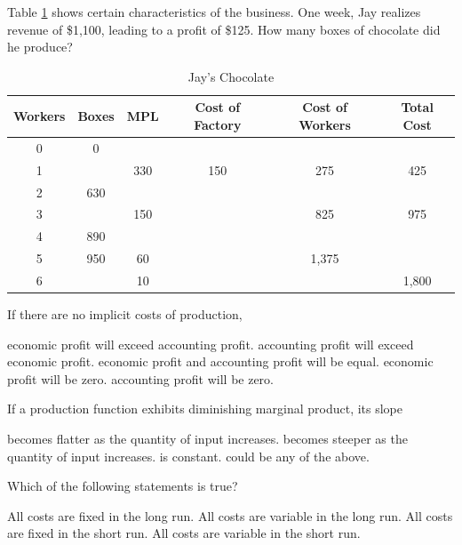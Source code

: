 \documentclass[addpoints,11pt]{exam}
\theoremstyle{definition}
\begin{document}
\begin{questions}
Table \ref{jay} shows certain characteristics of the business. One week, Jay realizes revenue of \$1,100, leading to a profit of \$125. How many boxes of chocolate did he produce?

\begin{table}[H]
	\caption{Jay's Chocolate}
	\centering
	\begin{tabular}{ c|c|c|c|c|c}        
		
		Workers  & Boxes & MPL & Cost of Factory & Cost of Workers & Total Cost \\
		\hline
		0 & 0 & & & & \\
		1 & & 330 & 150 & 275 & 425 \\
		2 & 630 & &&& \\
		3 &  & 150 & & 825 & 975  \\
		4 & 890 & &&& \\
		5 & 950 & 60 & & 1,375 & \\
		6 &  & 10 &&& 1,800 \\
	\end{tabular}
	\label{jay}
\end{table}

\begin{choices}
\end{choices}

\newpage

\question If there are no implicit costs of production,

\begin{choices}
	\choice economic profit will exceed accounting profit.
	\choice accounting profit will exceed economic profit.
	\CorrectChoice economic profit and accounting profit will be equal.
	\choice economic profit will be zero.
	\choice accounting profit will be zero.
\end{choices}

\question If a production function exhibits diminishing marginal product, its slope 

\begin{choices}
	\CorrectChoice becomes flatter as the quantity of input increases.
	\choice becomes steeper as the quantity of input increases.
	\choice is constant.
	\choice could be any of the above.
\end{choices}

\question Which of the following statements is true?

\begin{choices}
	\choice All costs are fixed in the long run.
	\CorrectChoice All costs are variable in the long run.
	\choice All costs are fixed in the short run.
	\choice All costs are variable in the short run.
\end{choices}


\end{questions}
\end{document}
